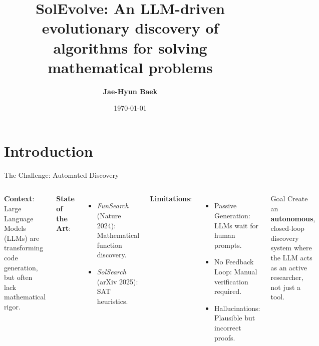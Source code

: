 \documentclass[10pt, aspectratio=169]{beamer}
\title{SolEvolve: An LLM-driven evolutionary discovery of algorithms for solving mathematical problems}
\author{\textbf{Jae-Hyun Baek}}
\institute{Dept. of Mathematics \\ Sogang University}
\date{\today}
\begin{document}
\begin{frame}
    \titlepage
\end{frame}

\section{Introduction}

\begin{frame}{The Challenge: Automated Discovery}
    \begin{columns}
        \textbf{Context}: Large Language Models (LLMs) are transforming code generation, but often lack mathematical rigor.
        
        \vspace{0.3cm}
        \textbf{State of the Art}:
        \begin{itemize}
            \item \textit{FunSearch} (Nature 2024): Mathematical function discovery.
            \item \textit{SolSearch} (arXiv 2025): SAT heuristics.
        \end{itemize}
        
        \vspace{0.3cm}
        \textbf{Limitations}:
        \begin{itemize}
            \item \alert{Passive Generation}: LLMs wait for human prompts.
            \item \alert{No Feedback Loop}: Manual verification required.
            \item \alert{Hallucinations}: Plausible but incorrect proofs.
        \end{itemize}

        \begin{alertblock}{Goal}
            Create an \textbf{autonomous}, closed-loop discovery system where the LLM acts as an active researcher, not just a tool.
        \end{alertblock}
    \end{columns}
\end{frame}
\end{document}
